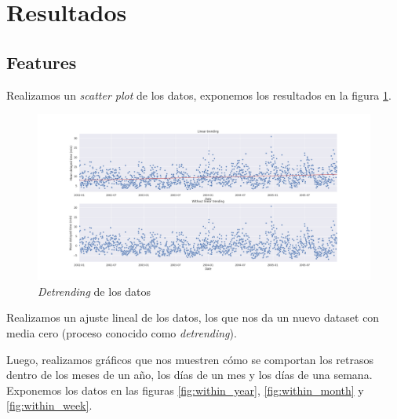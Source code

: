 \section{Resultados}\label{sec:resultados}

\subsection{Features}\label{subsec:features}

Realizamos un \textit{scatter plot} de los datos, exponemos los resultados en la figura \ref{fig:trending}.

\begin{figure}[hbtp]
  \centering
  \includegraphics[width=\textwidth]{plots/linear_trending.png}
  \caption{\textit{Detrending} de los datos}
  \label{fig:trending}
\end{figure}

Realizamos un ajuste lineal de los datos, los que nos da un nuevo dataset con media cero (proceso conocido
como \textit{detrending}).

Luego, realizamos gr\'aficos que nos muestren c\'omo se comportan los retrasos dentro de los meses de un a\~no, los
d\'ias de un mes y los d\'ias de una semana. Exponemos los datos en las figuras \ref{fig:within_year}, \ref{fig:within_month}
y \ref{fig:within_week}.

